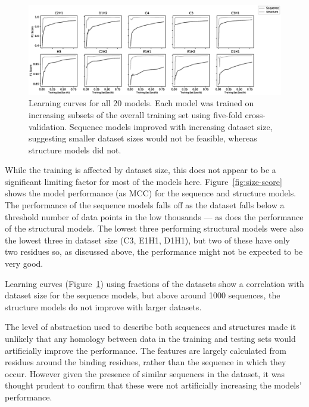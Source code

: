 \begin{figure}
\centering
\includegraphics[width=1.0\textwidth]{Figures/learning-curve.eps}
\caption[Learning curves for all 20 models.]{\label{fig:learning-curves} Learning curves for all 20
  models. Each model was trained on increasing subsets of the overall
  training set using five-fold cross-validation. Sequence models
  improved with increasing dataset size, suggesting smaller dataset
  sizes would not be feasible, whereas structure models did not.}
\end{figure}

While the training is affected by dataset size, this does not appear to be a significant limiting factor for most of the models here. Figure~\ref{fig:size-score} shows the model performance (as MCC) for the sequence and structure models. The performance of the sequence models falls off as the dataset falls below a threshold number of data points in the low thousands --- as does the performance of the structural models. The lowest three performing structural models were also the lowest three in dataset size (C3, E1H1, D1H1), but two of these have only two residues so, as discussed above, the performance might not be expected to be very good.

Learning curves (Figure~\ref{fig:learning-curves}) using fractions of the datasets show a correlation with dataset size for the sequence models, but above around 1000 sequences, the structure models do not improve with larger datasets.

The level of abstraction used to describe both sequences and structures made it unlikely that any homology between data in the training and testing sets would artificially improve the performance. The features are largely calculated from residues around the binding residues, rather than the sequence in which they occur. However given the presence of similar sequences in the dataset, it was thought prudent to confirm that these were not artificially increasing the models' performance.

